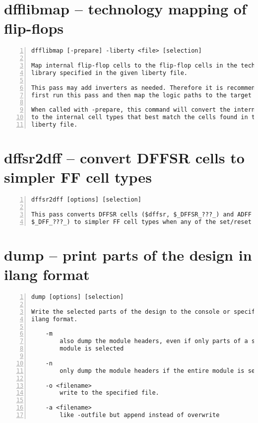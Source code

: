 \section{dfflibmap -- technology mapping of flip-flops}
\label{cmd:dfflibmap}
\begin{lstlisting}[numbers=left,frame=single]
    dfflibmap [-prepare] -liberty <file> [selection]

Map internal flip-flop cells to the flip-flop cells in the technology
library specified in the given liberty file.

This pass may add inverters as needed. Therefore it is recommended to
first run this pass and then map the logic paths to the target technology.

When called with -prepare, this command will convert the internal FF cells
to the internal cell types that best match the cells found in the given
liberty file.
\end{lstlisting}

\section{dffsr2dff -- convert DFFSR cells to simpler FF cell types}
\label{cmd:dffsr2dff}
\begin{lstlisting}[numbers=left,frame=single]
    dffsr2dff [options] [selection]

This pass converts DFFSR cells ($dffsr, $_DFFSR_???_) and ADFF cells ($adff,
$_DFF_???_) to simpler FF cell types when any of the set/reset inputs is unused.
\end{lstlisting}

\section{dump -- print parts of the design in ilang format}
\label{cmd:dump}
\begin{lstlisting}[numbers=left,frame=single]
    dump [options] [selection]

Write the selected parts of the design to the console or specified file in
ilang format.

    -m
        also dump the module headers, even if only parts of a single
        module is selected

    -n
        only dump the module headers if the entire module is selected

    -o <filename>
        write to the specified file.

    -a <filename>
        like -outfile but append instead of overwrite
\end{lstlisting}

